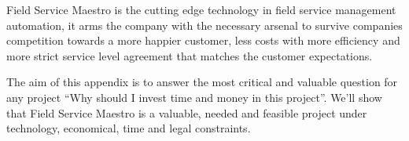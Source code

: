 Field Service Maestro is the cutting edge technology in field service management automation, it arms the company with the necessary arsenal to survive companies competition towards a more happier customer, less costs with more efficiency and more strict service level agreement that matches the customer expectations.

The aim of this appendix is to answer the most critical and valuable question for any project ``Why should I invest time and money in this project''. We'll show that Field Service Maestro is a valuable, needed and feasible project under technology, economical, time and legal constraints.
